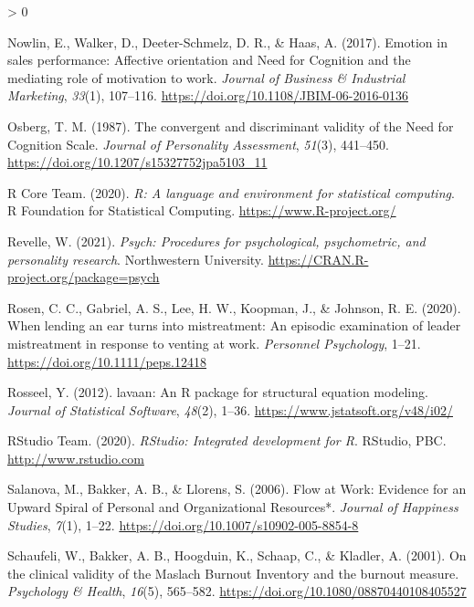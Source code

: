 \documentclass[
  english,
  man]{apa6}
\newlength{\cslhangindent}
\newenvironment{CSLReferences}[2] %
 {%
  \setlength{\parindent}{0pt}
  \ifodd #1 \everypar{\setlength{\hangindent}{\cslhangindent}}\ignorespaces\fi
  \ifnum #2 > 0
  \setlength{\parskip}{#2\baselineskip}
  \fi
 }%
 {}
\begin{document}
\begin{CSLReferences}{1}{0}
\leavevmode\hypertarget{ref-Nowlin2017}{}%
Nowlin, E., Walker, D., Deeter-Schmelz, D. R., \& Haas, A. (2017). Emotion in sales performance: Affective orientation and {Need} for {Cognition} and the mediating role of motivation to work. \emph{Journal of Business \& Industrial Marketing}, \emph{33}(1), 107--116. \url{https://doi.org/10.1108/JBIM-06-2016-0136}

\leavevmode\hypertarget{ref-Osberg1987}{}%
Osberg, T. M. (1987). The convergent and discriminant validity of the {Need} for {Cognition} {Scale}. \emph{Journal of Personality Assessment}, \emph{51}(3), 441--450. \url{https://doi.org/10.1207/s15327752jpa5103_11}

\leavevmode\hypertarget{ref-RCT2020}{}%
R Core Team. (2020). \emph{R: {A} language and environment for statistical computing}. R Foundation for Statistical Computing. \url{https://www.R-project.org/}

\leavevmode\hypertarget{ref-Revelle2021}{}%
Revelle, W. (2021). \emph{Psych: {P}rocedures for psychological, psychometric, and personality research}. Northwestern University. \url{https://CRAN.R-project.org/package=psych}

\leavevmode\hypertarget{ref-Rosen2020}{}%
Rosen, C. C., Gabriel, A. S., Lee, H. W., Koopman, J., \& Johnson, R. E. (2020). When lending an ear turns into mistreatment: {An} episodic examination of leader mistreatment in response to venting at work. \emph{Personnel Psychology}, 1--21. \url{https://doi.org/10.1111/peps.12418}

\leavevmode\hypertarget{ref-Rosseel2012}{}%
Rosseel, Y. (2012). {lavaan}: {A}n {R} package for structural equation modeling. \emph{Journal of Statistical Software}, \emph{48}(2), 1--36. \url{https://www.jstatsoft.org/v48/i02/}

\leavevmode\hypertarget{ref-RStudioTeam2020}{}%
RStudio Team. (2020). \emph{{RStudio}: {Integrated} development for {R}}. RStudio, PBC. \url{http://www.rstudio.com}

\leavevmode\hypertarget{ref-Salanova2006}{}%
Salanova, M., Bakker, A. B., \& Llorens, S. (2006). Flow at {Work}: {Evidence} for an {Upward} {Spiral} of {Personal} and {Organizational} {Resources}*. \emph{Journal of Happiness Studies}, \emph{7}(1), 1--22. \url{https://doi.org/10.1007/s10902-005-8854-8}

\leavevmode\hypertarget{ref-Schaufeli2001}{}%
Schaufeli, W., Bakker, A. B., Hoogduin, K., Schaap, C., \& Kladler, A. (2001). On the clinical validity of the {Maslach} {Burnout} {Inventory} and the burnout measure. \emph{Psychology \& Health}, \emph{16}(5), 565--582. \url{https://doi.org/10.1080/08870440108405527}


\end{CSLReferences}
\end{document}
